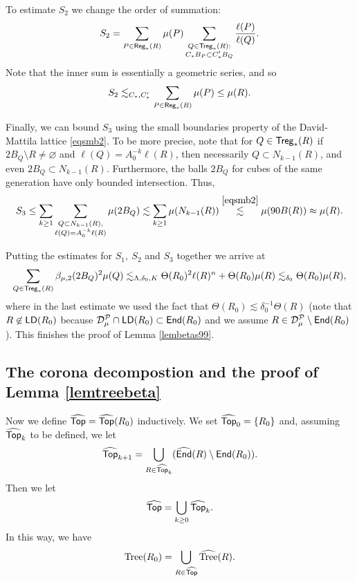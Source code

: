 To estimate $S_2$ we change the order of summation:
\begin{equation*}
S_2 = \sum_{P\in{\mathsf{Reg}}_*(R)}\mu(P)\sum_{\substack{Q\in{\mathsf{Treg}}_*(R):\\  C_*B_P\subset C_*'B_Q}}\frac{\ell(P)}{\ell(Q)}.
\end{equation*}
Note that the inner sum is essentially a geometric series, and so
\begin{equation*}
S_2 \lesssim_{C_*,C_*'} \sum_{P\in{\mathsf{Reg}}_*(R)}\mu(P)\le \mu(R).
\end{equation*}

Finally, we can bound $S_3$ using the small boundaries property of the David-Mattila lattice \eqref{eqsmb2}. To be more precise, note that for $Q\in{\mathsf{Treg}}_*(R)$ if $2B_Q\setminus R\neq\varnothing$ and $\ell(Q)=A_0^{-k}\ell(R)$, then necessarily $Q\subset N_{k-1}(R)$, and even $2B_Q\subset N_{k-1}(R)$. Furthermore, the balls $2B_Q$ for cubes of the same generation have only bounded intersection. Thus,
\begin{equation*}
S_3\le \sum_{k\ge 1}\sum_{\substack{Q\subset N_{k-1}(R),\\ \ell(Q)=A_0^{-k}\ell(R)}}\mu(2B_Q)\lesssim \sum_{k\ge 1}\mu(N_{k-1}(R))\overset{\eqref{eqsmb2}}{\lesssim}\mu(90B(R))\approx\mu(R).
\end{equation*}

Putting the estimates for $S_1,\ S_2$ and $S_3$ together we arrive at
\begin{equation*}
\sum_{Q\in{\mathsf{Treg}}_*(R)}\beta_{\mu,2}(2B_Q)^2\mu(Q)\lesssim_{\Lambda,\delta_0,K} \Theta(R_0)^2\ell(R)^n + \Theta(R_0)\mu(R)\lesssim_{\delta_0}\Theta(R_0)\mu(R),
\end{equation*}
where in the last estimate we used the fact that $\Theta(R_0)\lesssim\delta_0^{-1}\Theta(R)$ (note that $R\not\in{\mathsf{LD}}(R_0)$ because ${\mathcal D}_\mu^{\mathcal P}\cap{\mathsf{LD}}(R_0)\subset{\mathsf{End}}(R_0)$ and we assume $R\in{\mathcal D}_\mu^{\mathcal P}\setminus{\mathsf{End}}(R_0)$). This finishes the proof of Lemma \ref{lembetas99}.




\vv

\subsection{The corona decompostion and the proof of Lemma \ref{lemtreebeta}}

Now we 
 define ${\widehat{{\mathsf {Top}}}}= {\widehat{{\mathsf {Top}}}}(R_0)$ inductively.
We set ${\widehat{{\mathsf {Top}}}}_0=\{R_0\}$ and, assuming ${\widehat{{\mathsf {Top}}}}_k$ to be defined, we let
$${\widehat{{\mathsf {Top}}}}_{k+1} = \bigcup_{R\in{\widehat{{\mathsf {Top}}}}_k} ({\widehat{{\mathsf{End}}}}(R)\setminus{\mathsf{End}}(R_0)).$$
Then we let
$${\widehat{{\mathsf {Top}}}} =\bigcup_{k\geq0} {\widehat{{\mathsf {Top}}}}_k.$$
In this way, we have
$${\rm Tree}(R_0)=\bigcup_{R\in{\widehat{{\mathsf {Top}}}}} {\widehat{{\rm Tree}}}(R).$$

